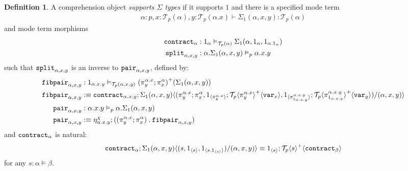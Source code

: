 \documentclass[10pt]{article}
\theoremstyle{definition}
\newtheorem{definition}{Definition}
\newcommand\TrPlus[2]{\ensuremath{{#1}^+(#2)}}
\newcommand\El[2]{\mathcal{T}_{#1}(#2)}
\newcommand\ApEl[2]{\mathcal{T}_{#1}\langle#2\rangle}
\newcommand\bdot[0]{\mathbin{.}}
\newcommand\ap[2]{\ensuremath{#1 \langle #2 \rangle }}
\newcommand\ApPlus[2]{\ensuremath{{#1}^+ \langle #2 \rangle }}
\begin{document}
\begin{definition}\label{def:supports-sigmas}
A comprehension object \emph{supports $\Sigma$ types} if it supports $1$ and there is a specified mode term
\begin{align*}
\alpha : p, x : \El{p}{\alpha}, y : \El{p}{\alpha.x} \vdash \Sigma_1(\alpha,x,y) : \El{p}{\alpha}
\end{align*}
and mode term morphisms
\begin{align*}
\contract{\alpha} &: 1_\alpha \vDash_{\El{p}{\alpha}} \Sigma_1(\alpha,1_\alpha,1_{\alpha.{1_\alpha}}) \\
\tsplit{\alpha,x,y} &: \alpha.\Sigma_1(\alpha,x,y) \vDash_{p} \alpha.x.y
\end{align*}
such that $\mathtt{split}_{\alpha,x,y}$ is an inverse to $\mathtt{pair}_{\alpha,x,y}$, defined by:
\begin{align*}
\fibpair{\alpha,x,y} &: 1_{\alpha.x.y} \vDash_{\El{p}{\alpha.x.y}} \TrPlus{(\pi^{\alpha.x}_y;\pi^\alpha_x)}{\Sigma_1(\alpha,x,y)} \\
\fibpair{\alpha,x,y} &:\equiv \contract{\alpha.x.y};\ap{\Sigma_1(\alpha,x,y)}{(\pi^{\alpha.x}_y;\pi^{\alpha}_x,\ApOne{\pi^{\alpha.x}_y};\ApPlus{\ApEl{p}{\pi^{\alpha.x}_y}}{\var{x}}, \ApOne{\pi^{\alpha.x.y}_{1_{\alpha.x.y}}};\ApPlus{\ApEl{p}{\pi^{\alpha.x.y}_{1_{\alpha.x.y}}}}{\var{y}})/(\alpha,x,y)} \\
\pair{\alpha,x,y} &: \alpha.x.y \vDash_{p} \alpha.\Sigma_1(\alpha,x,y) \\
\pair{\alpha, x, y} &:\equiv \eta^\chi_{\alpha.x.y};((\pi^{\alpha.x}_y;\pi^\alpha_x) \bdot \fibpair{\alpha,x,y})
\end{align*}
and $\mathtt{contract}_{\alpha}$ is natural:
\begin{align}
\contract{\alpha};\ap{\Sigma_1(\alpha,x,y)}{(s, \ApOne{s}, \ApOne{s \bdot \ApOne{s}})/(\alpha,x,y)} \equiv \ApOne{s};\ApPlus{\ApEl{p}{s}}{\contract{\beta}}
\end{align}
for any $s : \alpha \vDash \beta$.
\end{definition}
\end{document}
